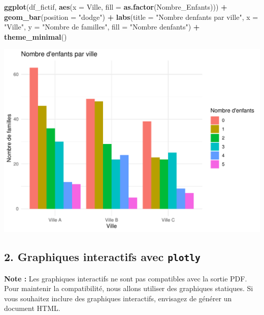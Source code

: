 \documentclass[
]{article}
\newenvironment{Shaded}{\begin{snugshade}}{\end{snugshade}}
\newcommand{\AttributeTok}[1]{\textcolor[rgb]{0.13,0.29,0.53}{#1}}
\newcommand{\FunctionTok}[1]{\textcolor[rgb]{0.13,0.29,0.53}{\textbf{#1}}}
\newcommand{\NormalTok}[1]{#1}
\newcommand{\SpecialCharTok}[1]{\textcolor[rgb]{0.81,0.36,0.00}{\textbf{#1}}}
\newcommand{\StringTok}[1]{\textcolor[rgb]{0.31,0.60,0.02}{#1}}
\begin{document}
\begin{Shaded}
\begin{Highlighting}[]
\FunctionTok{ggplot}\NormalTok{(df\_fictif, }\FunctionTok{aes}\NormalTok{(}\AttributeTok{x =}\NormalTok{ Ville, }\AttributeTok{fill =} \FunctionTok{as.factor}\NormalTok{(Nombre\_Enfants))) }\SpecialCharTok{+}
  \FunctionTok{geom\_bar}\NormalTok{(}\AttributeTok{position =} \StringTok{"dodge"}\NormalTok{) }\SpecialCharTok{+}
  \FunctionTok{labs}\NormalTok{(}\AttributeTok{title =} \StringTok{"Nombre d\textquotesingle{}enfants par ville"}\NormalTok{, }\AttributeTok{x =} \StringTok{"Ville"}\NormalTok{, }\AttributeTok{y =} \StringTok{"Nombre de familles"}\NormalTok{, }\AttributeTok{fill =} \StringTok{"Nombre d\textquotesingle{}enfants"}\NormalTok{) }\SpecialCharTok{+}
  \FunctionTok{theme\_minimal}\NormalTok{()}
\end{Highlighting}
\end{Shaded}

\includegraphics{TP_1_files/figure-latex/barres-enfants-ville-1.pdf}

\hypertarget{graphiques-interactifs-avec-plotly}{%
\subsection{\texorpdfstring{2. Graphiques interactifs avec
\texttt{plotly}}{2. Graphiques interactifs avec plotly}}\label{graphiques-interactifs-avec-plotly}}

\textbf{Note :} Les graphiques interactifs ne sont pas compatibles avec
la sortie PDF. Pour maintenir la compatibilité, nous allons utiliser des
graphiques statiques. Si vous souhaitez inclure des graphiques
interactifs, envisagez de générer un document HTML.
\end{document}
